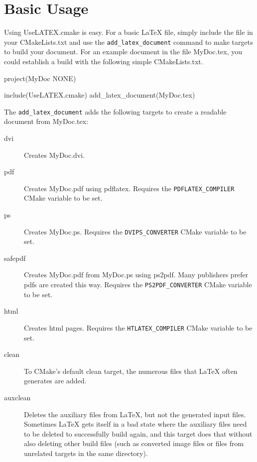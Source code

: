 \documentclass{article}
\newcommand*{\textfile}[1]{\textsf{#1}}
\newcommand*{\textprog}[1]{\textfile{#1}}
\newcommand*{\textcmake}[1]{\texttt{#1}}
\newcommand*{\textcmakevar}[1]{\textcmake{#1}}
\newcommand*{\textmaketarget}[1]{#1}
\newcommand*{\UseLATEX}{\textfile{UseLATEX.cmake}\xspace}
\newcommand*{\latex}{\LaTeX\xspace}
\newcommand*{\ald}{\textcmake{add\_latex\_document}\xspace}
\begin{document}

  \section{Basic Usage}
  \label{sec:BasicUsage}

  Using \UseLATEX is easy. For a basic \latex file, simply include the file
  in your \textfile{CMakeLists.txt} and use the \ald command to make
  targets to build your document. For an example document in the file
  \textfile{MyDoc.tex}, you could establish a build with the following
  simple \textfile{CMakeLists.txt}.

  \begin{CodeListing}
project(MyDoc NONE)

include(UseLATEX.cmake)
add_latex_document(MyDoc.tex)
  \end{CodeListing}

  The \ald adds the following targets to create a readable document from
  \textfile{MyDoc.tex}:

  \begin{description}
    \item[\textmaketarget{dvi}] Creates \textfile{MyDoc.dvi}.
    \item[\textmaketarget{pdf}] Creates \textfile{MyDoc.pdf} using
      \textprog{pdflatex}. Requires the \textcmakevar{PDFLATEX\_COMPILER}
      CMake variable to be set.
    \item[\textmaketarget{ps}] Creates \textfile{MyDoc.ps}. Requires the
      \textcmakevar{DVIPS\_CONVERTER} CMake variable to be set.
    \item[\textmaketarget{safepdf}] Creates \textfile{MyDoc.pdf} from
      \textfile{MyDoc.ps} using \textprog{ps2pdf}. Many publishers prefer
      pdfs are created this way. Requires the
      \textcmakevar{PS2PDF\_CONVERTER} CMake variable to be set.
    \item[\textmaketarget{html}] Creates html pages. Requires the
      \textcmakevar{HTLATEX\_COMPILER} CMake variable to be set.
    \item[\textmaketarget{clean}] To CMake's default \textmaketarget{clean}
      target, the numerous files that \latex often generates are added.
    \item[\textmaketarget{auxclean}] Deletes the auxiliary files from
      \latex, but not the generated input files.  Sometimes \latex gets
      itself in a bad state where the auxiliary files need to be deleted to
      successfully build again, and this target does that without also
      deleting other build files (such as converted image files or files
      from unrelated targets in the same directory).
  \end{description}
\end{document}

